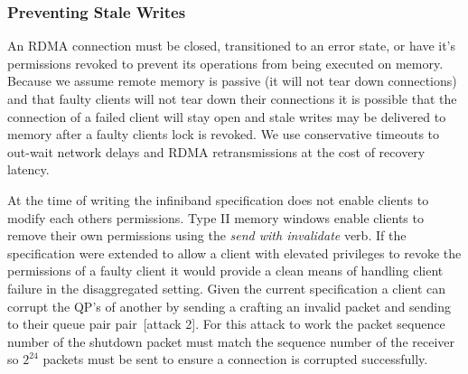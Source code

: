 \subsubsection{Preventing Stale Writes}
\label{sec:stale-writes}

An RDMA connection must be closed, transitioned to an error
state, or have it's permissions revoked to prevent its
operations from being executed on memory. Because we assume
remote memory is passive (it will not tear down connections)
and that faulty clients will not tear down their connections
it is possible that the connection of a failed client will
stay open and stale writes may be delivered to memory after
a faulty clients lock is revoked. We use conservative
timeouts to out-wait network delays and RDMA retransmissions
at the cost of recovery latency. 

At the time of writing the infiniband specification does not
enable clients to modify each others permissions. Type II
memory windows enable clients to remove their own
permissions using the \textit{send with invalidate} verb. If
the specification were extended to allow a client with
elevated privileges to revoke the permissions of a faulty
client it would provide a clean means of handling client
failure in the disaggregated setting. Given the current
specification a client can corrupt the QP's of another by
sending a crafting an invalid packet and sending to their
queue pair pair~\cite{redmark}[attack 2]. For this attack to
work the packet sequence number of the shutdown packet must
match the sequence number of the receiver so $2^{24}$
packets must be sent to ensure a connection is corrupted
successfully.




